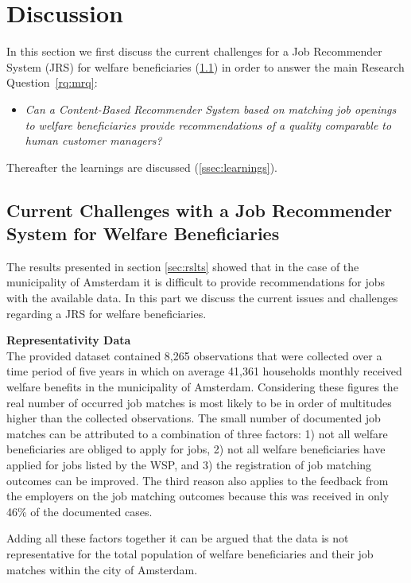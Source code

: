 \section{Discussion}
\label{sec:disc}
In this section we first discuss the current challenges for a Job Recommender System (JRS) for 
welfare beneficiaries (\ref{ssec:jrswb}) in order to answer the main Research Question~\ref{rq:mrq}: 
\begin{itemize}
	\item[] \em Can a Content-Based Recommender System based on matching job openings to welfare beneficiaries provide recommendations of a quality comparable to human customer managers?
\end{itemize}
Thereafter the learnings are discussed (\ref{ssec:learnings}). 

\subsection{Current Challenges with a Job Recommender System for Welfare Beneficiaries}
\label{ssec:jrswb}
The results presented in section \ref{sec:rslts} showed that in the case of the municipality of Amsterdam it is difficult to provide recommendations for jobs with the available data.
In this part we discuss the current issues and challenges regarding a JRS for welfare beneficiaries.

\noindent
\textbf{Representativity Data}\\
The provided dataset contained 8,265 observations that were collected over a time period of five years in which on average 41,361 households monthly received welfare benefits in the municipality of Amsterdam.
Considering these figures the real number of occurred job matches is most likely to be in order of multitudes higher than the collected observations.
The small number of documented job matches can be attributed to a combination of three factors: 1) not all welfare beneficiaries are obliged to apply for jobs, 2) not all welfare beneficiaries have applied for jobs listed by the WSP, and 3) the registration of job matching outcomes can be improved. 
The third reason also applies to the feedback from the employers on the job matching outcomes because this was received in only 46\% of the documented cases.

Adding all these factors together it can be argued that the data is not representative for the total population of welfare beneficiaries and their job matches within the city of Amsterdam. 

